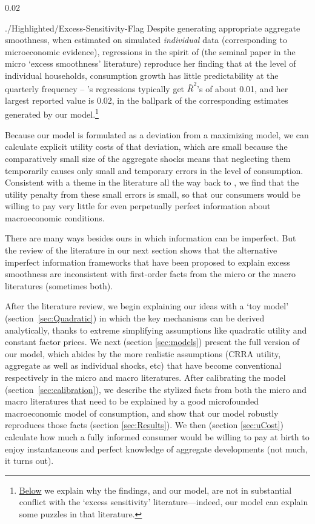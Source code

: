 \hypertarget{dynanR2}{0.02}
\hypertarget{Excess-Sesitivity-Flag}{} %
\begin{verbatimwrite}{./Highlighted/Excess-Sensitivity-Flag}
Despite generating appropriate aggregate smoothness, when estimated on simulated \emph{individual} data (corresponding to microeconomic evidence), regressions in the spirit of  \cite{dynanHabits} (the seminal paper in the micro `excess smoothness' literature) reproduce her finding that at the level of individual households, consumption growth has little predictability at the quarterly frequency -- \cite{dynanHabits}'s regressions typically get $\bar{R}^{2}$'s %
 of about 0.01, and her largest reported value is 0.02, in the ballpark of the corresponding estimates generated by our model.\footnote{\hyperlink{Excess-Sensitivity}{Below} we explain why the \cite{hrsHabit} findings, and our model, are not in substantial conflict with the `excess sensitivity' literature---indeed, our model can explain some puzzles in that literature.}
\end{verbatimwrite}


Because our model is formulated as a deviation from a maximizing model, we can calculate explicit utility costs of that deviation, which are small because the comparatively small size of the aggregate shocks means that neglecting them temporarily causes only small and temporary errors in the level of consumption.  Consistent with a theme in the literature all the way back to \cite{ayNearRational}, we find that the utility penalty from these small errors is small, so that our consumers would be willing to pay very little for even perpetually perfect information about macroeconomic conditions.

There are many ways besides ours in which information can be imperfect.  But the review of the literature in our next section shows that the alternative imperfect information frameworks that have been proposed to explain excess smoothness are inconsistent with first-order facts from the micro or the macro literatures (sometimes both).

After the literature review, we begin explaining our ideas with a `toy model' (section~\ref{sec:Quadratic}) in which the key mechanisms can be derived analytically, thanks to extreme simplifying assumptions like quadratic utility and constant factor prices.  We next (section \ref{sec:models}) present the full version of our model, which abides by the more realistic assumptions (CRRA utility, aggregate as well as individual shocks, etc) that have become conventional respectively in the micro and macro literatures. After calibrating the model (section~\ref{sec:calibration}), we describe the stylized facts from both the micro and macro literatures that need to be explained by a good microfounded macroeconomic model of consumption, and show that our model robustly reproduces those facts (section \ref{sec:Results}).
We then (section \ref{sec:uCost}) calculate how much a fully informed consumer would be willing to pay at birth to enjoy instantaneous and perfect knowledge of aggregate developments (not much, it turns out).


